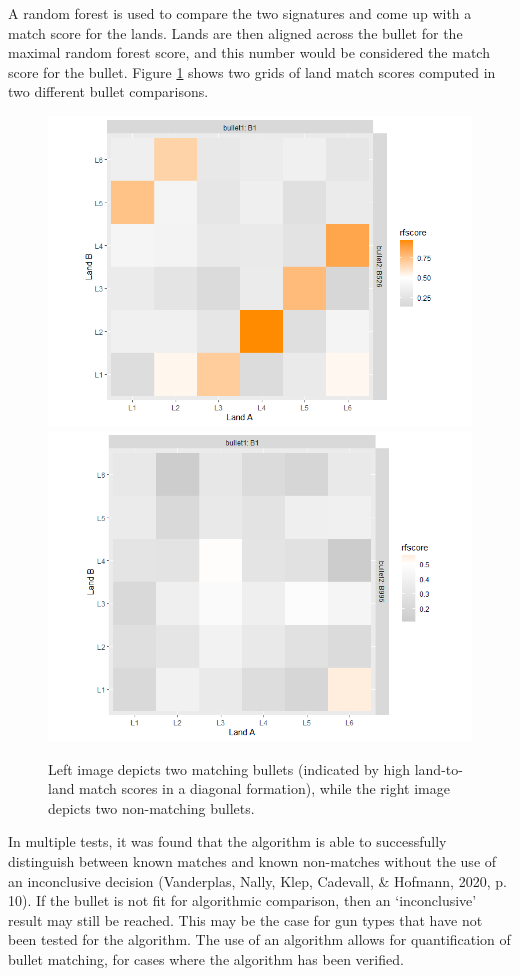 \documentclass[print]{nuthesis}
\begin{document}
A random forest is used to compare the two signatures and come up with a match score for the lands.
Lands are then aligned across the bullet for the maximal random forest score, and this number would be considered the match score for the bullet.
Figure \ref{fig:gridcompare} shows two grids of land match scores computed in two different bullet comparisons.

\begin{figure}

{\centering \includegraphics[width=0.49\linewidth]{images/F526_Match_SingleGrid} \includegraphics[width=0.49\linewidth]{images/K995_NoMatch_SingleGrid} 

}

\caption{Left image depicts two matching bullets (indicated by high land-to-land match scores in a diagonal formation), while the right image depicts two non-matching bullets.}\label{fig:gridcompare}
\end{figure}

In multiple tests, it was found that the algorithm is able to successfully distinguish between known matches and known non-matches without the use of an inconclusive decision (Vanderplas, Nally, Klep, Cadevall, \& Hofmann, 2020, p. 10).
If the bullet is not fit for algorithmic comparison, then an `inconclusive' result may still be reached.
This may be the case for gun types that have not been tested for the algorithm.
The use of an algorithm allows for quantification of bullet matching, for cases where the algorithm has been verified.
\end{document}
